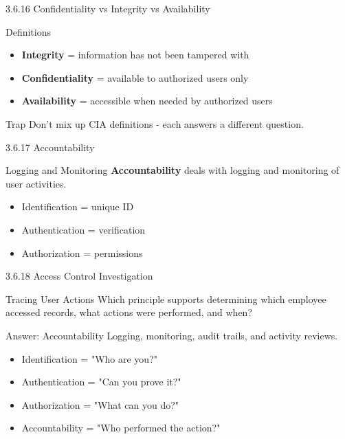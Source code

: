 \documentclass{beamer}
\begin{document}
	\begin{frame}{3.6.16 Confidentiality vs Integrity vs Availability}
		\begin{block}{Definitions}
			\begin{itemize}
				\item \textbf{Integrity} = information has not been tampered with
				\item \textbf{Confidentiality} = available to authorized users only
				\item \textbf{Availability} = accessible when needed by authorized users
			\end{itemize}
		\end{block}
		\begin{alertblock}{Trap}
			Don't mix up CIA definitions - each answers a different question.
		\end{alertblock}
	\end{frame}
	
	\begin{frame}{3.6.17 Accountability}
		\begin{block}{Logging and Monitoring}
			\textbf{Accountability} deals with logging and monitoring of user activities.
		\end{block}
		\begin{itemize}
			\item Identification = unique ID
			\item Authentication = verification
			\item Authorization = permissions
		\end{itemize}
	\end{frame}
	
	\begin{frame}{3.6.18 Access Control Investigation}
		\begin{block}{Tracing User Actions}
			Which principle supports determining which employee accessed records, what actions were performed, and when?
		\end{block}
		\begin{exampleblock}{Answer: Accountability}
			Logging, monitoring, audit trails, and activity reviews.
		\end{exampleblock}
		\begin{itemize}
			\item Identification = "Who are you?"
			\item Authentication = "Can you prove it?"
			\item Authorization = "What can you do?"
			\item Accountability = "Who performed the action?"
		\end{itemize}
	\end{frame}
	
\end{document}
